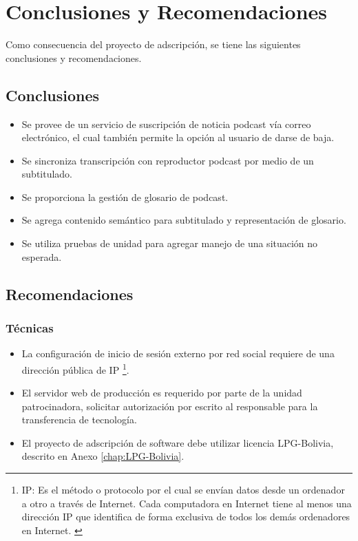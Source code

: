 \chapter{Conclusiones y Recomendaciones}

Como consecuencia del proyecto de adscripción, se tiene las siguientes
conclusiones y recomendaciones.

\section{Conclusiones}

\begin{itemize}

\item Se provee de un servicio de suscripción de noticia podcast vía correo
electrónico, el cual también permite la opción al usuario de darse de baja.

\item Se sincroniza transcripción con reproductor podcast por medio de un
subtitulado.

\item Se proporciona la gestión de glosario de podcast.

\item Se agrega contenido semántico para subtitulado y representación de
glosario.

\item Se utiliza pruebas de unidad para agregar manejo de una situación no 
esperada.

\end{itemize}

\section{Recomendaciones}

\subsection{Técnicas}

\begin{itemize}

\item La configuración de inicio de sesión externo por red social requiere
de una dirección pública de IP \footnote{IP: Es el método o protocolo por el cual
se envían datos desde un ordenador a otro a través de Internet. Cada
computadora en Internet tiene al menos una dirección IP que identifica de
forma exclusiva de todos los demás ordenadores en Internet. \cite{ip}}.

\item El servidor web de producción es requerido  por parte de la unidad
patrocinadora, solicitar autorización por escrito al responsable para
la transferencia de tecnología.

\item El proyecto de adscripción de software debe utilizar licencia LPG-Bolivia,
descrito en Anexo \ref{chap:LPG-Bolivia}.

\end{itemize}

